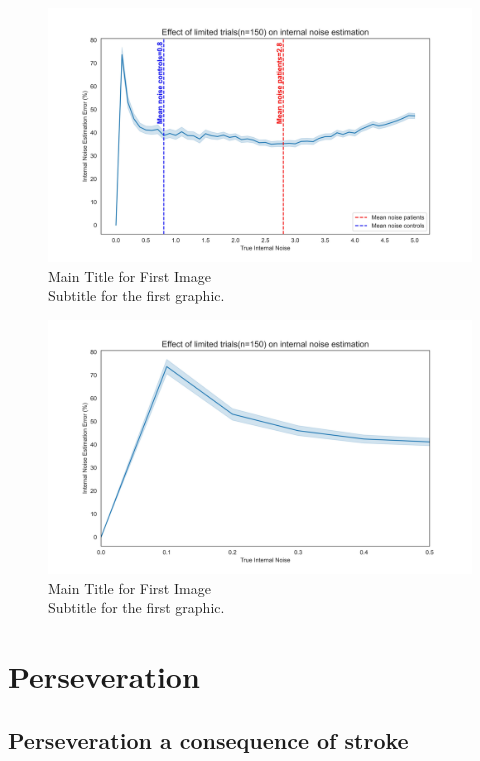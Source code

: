 \begin{figure}[ht!]
    \centering
    \includegraphics[width=15cm]{MainLayout/Images/chapter5/noise_150.jpg}
    \caption{Main Title for First Image \\ \small Subtitle for the first graphic.}
    \label{fig:noise_150}
\end{figure}

\begin{figure}[ht!]
    \centering
    \includegraphics[width=15cm]{MainLayout/Images/chapter5/noise_150_0to05.jpg}
    \caption{Main Title for First Image \\ \small Subtitle for the first graphic.}
    \label{fig:noise_150_0to05}
\end{figure}
\section {Perseveration} 

\subsection {Perseveration a consequence of stroke} 

